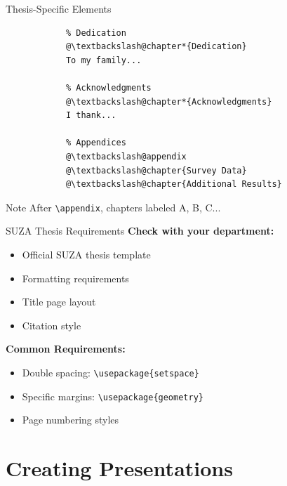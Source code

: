 \documentclass[aspectratio=169]{beamer}
\begin{document}
	\begin{frame}[fragile]{Thesis-Specific Elements}
		\begin{lstlisting}
			% Dedication
			@\textbackslash@chapter*{Dedication}
			To my family...
			
			% Acknowledgments
			@\textbackslash@chapter*{Acknowledgments}
			I thank...
			
			% Appendices
			@\textbackslash@appendix
			@\textbackslash@chapter{Survey Data}
			@\textbackslash@chapter{Additional Results}
		\end{lstlisting}
		
		\begin{alertblock}{Note}
			After \texttt{\textbackslash appendix}, chapters labeled A, B, C...
		\end{alertblock}
	\end{frame}
	
	\begin{frame}{SUZA Thesis Requirements}
		\textbf{Check with your department:}
		\begin{itemize}
			\item Official SUZA thesis template
			\item Formatting requirements
			\item Title page layout
			\item Citation style
		\end{itemize}
		
		\vspace{1em}
		
		\textbf{Common Requirements:}
		\begin{itemize}
			\item Double spacing: \texttt{\textbackslash usepackage\{setspace\}}
			\item Specific margins: \texttt{\textbackslash usepackage\{geometry\}}
			\item Page numbering styles
		\end{itemize}
	\end{frame}
	
	\section{Creating Presentations}
	
\end{document}
